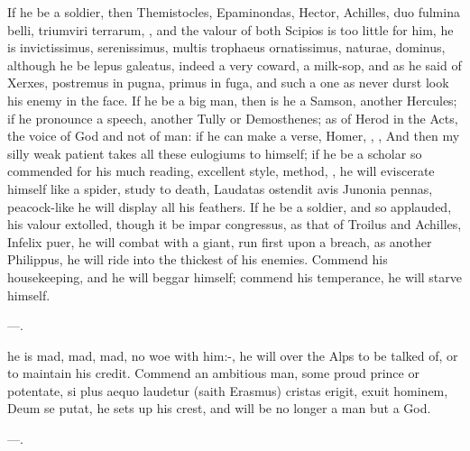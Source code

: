 {If he be a soldier, then Themistocles, Epaminondas, Hector, Achilles,
duo fulmina belli, triumviri terrarum, \etc{}, and the valour of both
Scipios is too little for him, he is invictissimus, serenissimus,
multis trophaeus ornatissimus, naturae, dominus, although he be lepus
galeatus, indeed a very coward, a milk-sop, and as he said of
Xerxes, postremus in pugna, primus in fuga, and such a one as never
durst look his enemy in the face. If he be a big man, then is he a
Samson, another Hercules; if he pronounce a speech, another Tully or
Demosthenes; as of Herod in the Acts, the voice of God and not of man:
if he can make a verse, Homer, \Virgil{}, \etc{}, And then my silly weak
patient takes all these eulogiums to himself; if he be a scholar so
commended for his much reading, excellent style, method, \etc{}, he will
eviscerate himself like a spider, study to death, Laudatas ostendit
avis Junonia pennas, peacock-like he will display all his feathers. If
he be a soldier, and so applauded, his valour extolled, though it be
impar congressus, as that of Troilus and Achilles, Infelix puer, he
will combat with a giant, run first upon a breach, as another
Philippus, he will ride into the thickest of his enemies. Commend
his housekeeping, and he will beggar himself; commend his temperance,
he will starve himself.

---.

he is mad, mad, mad, no woe with him:-, he will
over the Alps to be talked of, or to maintain his credit. Commend
an ambitious man, some proud prince or potentate, si plus aequo
lau\-de\-tur (saith Erasmus) cristas erigit, exuit hominem, Deum se
putat, he sets up his crest, and will be no longer a man but a God.

---.

}
